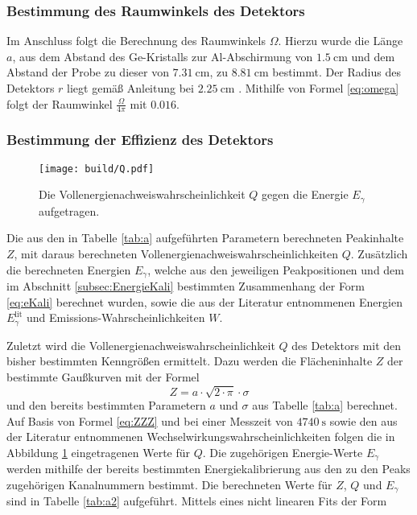 \subsubsection{Bestimmung des Raumwinkels des Detektors}
Im Anschluss folgt die Berechnung des Raumwinkels $\Omega$. Hierzu wurde die Länge $a$, aus dem Abstand des Ge-Kristalls zur Al-Abschirmung von $\SI{1.5}{\centi\meter}$ und dem Abstand der Probe zu dieser von $\SI{7.31}{\centi\meter}$, zu $\SI{8.81}{\centi\meter}$ bestimmt. Der Radius des Detektors $r$ liegt gemäß Anleitung bei $\SI{2.25}{\centi\meter}$ \cite{V18}. Mithilfe von Formel \eqref{eq:omega} folgt der Raumwinkel $\frac{\Omega}{4 \pi}$ mit $\num{0.016}$.


\subsubsection{Bestimmung der Effizienz des Detektors}
\begin{figure}
	\centering
	\texttt{[image: build/Q.pdf]}
	\caption{Die Vollenergienachweiswahrscheinlichkeit $Q$ gegen die Energie $E_\gamma$ aufgetragen.}
	\label{fig:Q}
\end{figure}
\begin{table}
	\centering
	\caption{Die aus den in Tabelle \ref{tab:a} aufgeführten Parametern berechneten Peakinhalte $Z$, mit daraus berechneten Vollenergienachweiswahrscheinlichkeiten $Q$. Zusätzlich die berechneten Energien $E_\gamma$, welche aus den jeweiligen Peakpositionen und dem im Abschnitt \ref{subsec:EnergieKali} bestimmten Zusammenhang der Form \eqref{eq:eKali} berechnet wurden, sowie die aus der Literatur entnommenen Energien $E_\gamma^\text{lit}$ und Emissions-Wahrscheinlichkeiten $W$.}
	
\end{table}
Zuletzt wird die Vollenergienachweiswahrscheinlichkeit $Q$ des Detektors mit den bisher bestimmten Kenngrößen ermittelt. Dazu werden die Flächeninhalte $Z$ der bestimmte Gaußkurven mit der Formel 
\begin{equation}
    Z = a \cdot \sqrt{2 \cdot \pi} \cdot \sigma \label{eq:flach}
\end{equation}
und den bereits bestimmten Parametern $a$ und $\sigma$ aus Tabelle \ref{tab:a} berechnet. Auf Basis von Formel \eqref{eq:ZZZ} und bei einer Messzeit von $\SI{4740}{\second}$ sowie den aus der Literatur entnommenen Wechselwirkungswahrscheinlichkeiten \cite{MARTIN20131497} folgen die in Abbildung \ref{fig:Q} eingetragenen Werte für $Q$. Die zugehörigen Energie-Werte $E_\gamma$ werden mithilfe der bereits bestimmten Energiekalibrierung aus den zu den Peaks zugehörigen Kanalnummern bestimmt. Die berechneten Werte für $Z$, $Q$ und $E_\gamma$ sind in Tabelle \ref{tab:a2} aufgeführt. Mittels eines nicht linearen Fits der Form 
